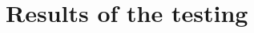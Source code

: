\documentclass[
  digital,  	%
  color,		%
  oneside,   	%
  12pt,
  nocover,
  notable,
  nolof,
  nolot,
]{fithesis3}
\theoremstyle{definition}
\theoremstyle{remark}
\begin{document}
\section{Results of the testing}
\end{document}
